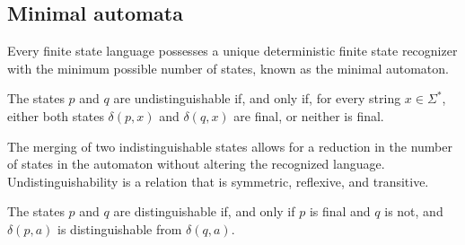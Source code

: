 \subsection{Minimal automata}
\begin{property}
    Every finite state language possesses a unique deterministic finite state recognizer with the minimum possible number of states, known as the minimal automaton.
\end{property}   
\begin{definition}
    The states $p$ and $q$ are undistinguishable if, and only if, for every string $x \in \Sigma^{*}$, either both states $\delta(p,x)$ and $\delta(q,x)$ are final, or neither is final.
\end{definition}
The merging of two indistinguishable states allows for a reduction in the number of states in the automaton without altering the recognized language.
Undistinguishability is a relation that is symmetric, reflexive, and transitive.
\begin{definition}
    The states $p$ and $q$ are distinguishable if, and only if $p$ is final and $q$ is not, and $\delta(p,a)$ is distinguishable from $\delta(q,a)$.
\end{definition}
